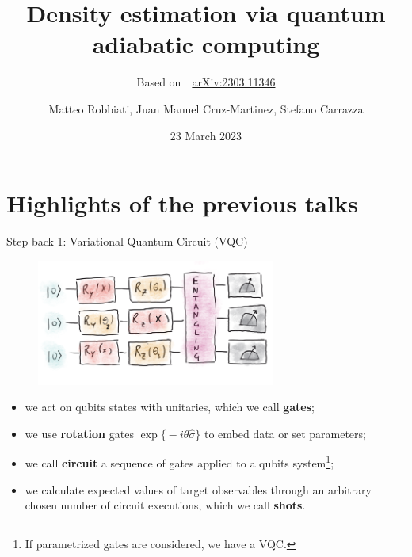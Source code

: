 \documentclass[8pt, xcolor={svgnames}, hyperref={colorlinks, linkcolor=black, citecolor=amethyst, urlcolor=amethyst}]{beamer}
\title{Density estimation via quantum adiabatic computing}
\subtitle{Based on \faBook\,\, \href{https://arxiv.org/abs/2303.11346}{arXiv:2303.11346}}
\date{23 March 2023}
\author[Matteo Robbiati, Juan Manuel Cruz-Martinez, Stefano Carrazza]{Matteo Robbiati, Juan Manuel Cruz-Martinez, Stefano Carrazza}
\begin{document}
\maketitle

\section{Highlights of the previous talks}

\begin{frame}{Step back 1: Variational Quantum Circuit (VQC)}
\begin{figure}
    \includegraphics[width=0.7\textwidth]{figures/variational_model.png}
\end{figure}
\large
\begin{itemize}[noitemsep]
    \pause
    \item[\faCheckSquareO] we act on qubits states with unitaries, which we call \textbf{gates};
    \pause
    \item[\faCheckSquareO] we use \textbf{rotation} gates 
    $\exp\bigl\{-i\theta \hat{\sigma}\bigr\}$ to embed data or set parameters;
    \pause
    \item[\faCheckSquareO] we call \textbf{circuit} a sequence of gates applied 
    to a qubits system\footnote<4->{If parametrized gates are considered, we have a VQC.}; 
    \pause
    \item[\faCheckSquareO] we calculate expected values of target observables 
    through an arbitrary chosen number of circuit executions, which we call \textbf{shots}.
\end{itemize}
\end{frame}
\end{document}
